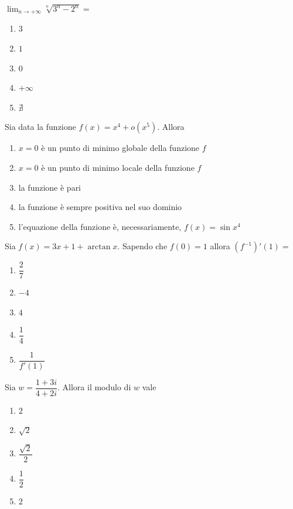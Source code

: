 \begin{quiz}
$\displaystyle\lim_{n\to+\infty}\sqrt[n]{3^n-2^n}=$
\begin{enumerate}
\item $3$
\item $1$
\item $0$
\item $+\infty$
\item $\nexists$
\end{enumerate}
\end{quiz}

\begin{quiz}
Sia data la funzione $f(x)=x^4+o(x^5)$. Allora
\begin{enumerate}
\item $x=0$ \`e un punto di minimo globale della funzione $f$
\item $x=0$ \`e un punto di minimo locale della funzione $f$
\item la funzione \`e pari
\item la funzione \`e sempre positiva nel suo dominio
\item l'equazione della funzione \`e, necessariamente, $f(x)=\sin x^4$
\end{enumerate}
\end{quiz}

\begin{quiz}
Sia $f(x)=3x+1+\arctan x$. Sapendo che $f(0)=1$ allora $(f^{-1})'(1)=$
\begin{enumerate}
\item $\dfrac27$
\item $-4$
\item $4$
\item $\dfrac14$
\item $\dfrac1{f'(1)}$
\end{enumerate}
\end{quiz}

\begin{quiz}
Sia $w=\dfrac{1+3i}{4+2i}$. Allora il modulo di $w$ vale
\begin{enumerate}
\item $2$
\item $\sqrt2$
\item $\dfrac{\sqrt2}2$
\item $\dfrac12$
\item $2$
\end{enumerate}
\end{quiz}

